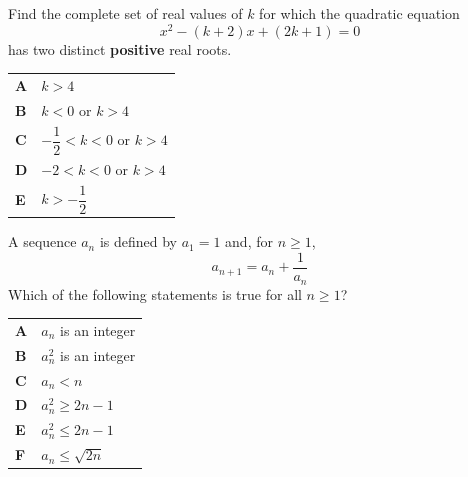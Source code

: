 \documentclass[11pt,a4paper]{article}
\begin{document}
\clearpage
\thispagestyle{djspaper}
\vspace*{8pt}
\begin{enumerate}[label=\textbf{\arabic*.},leftmargin=*,itemsep=0pt,start=10]
\questionitem[Polynomials]
Find the complete set of real values of $k$ for which the quadratic equation
\[
x^2 - (k+2)x + (2k+1) = 0
\]
has two distinct \textbf{positive} real roots.

\par\vspace*{12pt}
\begin{tabularx}{\linewidth}{@{}>{\bfseries}l Y@{}}
A &
$k > 4$
\\[0.8em]
B &
$k < 0$ or $k > 4$
\\[0.8em]
C &
$-\dfrac{1}{2} < k < 0$ or $k > 4$
\\[0.8em]
D &
$-2 < k < 0$ or $k > 4$
\\[0.8em]
E &
$k > -\dfrac{1}{2}$
\\
\end{tabularx}
\end{enumerate}
\clearpage
\thispagestyle{djspaper}
\vspace*{8pt}
\begin{enumerate}[label=\textbf{\arabic*.},leftmargin=*,itemsep=0pt,start=11]
A sequence $a_n$ is defined by $a_1=1$ and, for $n\ge 1$, \[ a_{n+1}=a_n+\dfrac{1}{a_n} \] Which of the following statements is true for all $n\ge 1$?

\par\vspace*{12pt}
\begin{tabularx}{\linewidth}{@{}>{\bfseries}l Y@{}}
A &
$a_n$ is an integer
\\[0.8em]
B &
$a_n^2$ is an integer
\\[0.8em]
C &
$a_n<n$
\\[0.8em]
D &
$a_n^2 \ge 2n-1$
\\[0.8em]
E &
$a_n^2 \le 2n-1$
\\[0.8em]
F &
$a_n \le \sqrt{2n}$
\\
\end{tabularx}
\end{enumerate}
\end{document}
